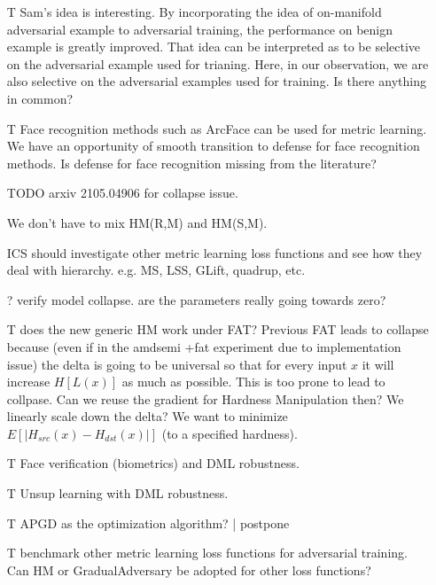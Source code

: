 \begin{itemize}
	
	\item [T] Sam's idea is interesting. By incorporating the idea of
		on-manifold adversarial example to adversarial training, the
		performance on benign example is greatly improved.
		That idea can be interpreted as to be selective on the adversarial
		example used for trianing.
		Here, in our observation, we are also selective on the adversarial
		examples used for training.
		Is there anything in common?

	\item [T] Face recognition methods such as ArcFace can be used for
		metric learning.
		We have an opportunity of smooth transition to defense for face
		recognition methods.
		Is defense for face recognition missing from the literature?

	\item [TODO] arxiv 2105.04906 for collapse issue.

	\item [\cmark] We don't have to mix HM(R,M) and HM(S,M).

	\item [ICS] should investigate other metric learning loss functions and see
		how they deal with hierarchy. e.g. MS, LSS, GLift, quadrup, etc.

	\item [?] verify model collapse. are the parameters really going towards zero?

	\item [T] does the new generic HM work under FAT?
		Previous FAT leads to collapse because (even if in the amdsemi +fat
		experiment due to implementation issue) the delta is going to be universal
		so that for every input $x$ it will increase $H[L(x)]$ as much as possible.
		This is too prone to lead to collpase. Can we reuse the gradient for 
		Hardness Manipulation then? We linearly scale down the delta?
		We want to minimize $E[|H_{src}(x)-H_{dst}(x)|]$ (to a specified hardness).

	\item [T] Face verification (biometrics) and DML robustness.

	\item [T] Unsup learning with DML robustness.

	\item [T] APGD as the optimization algorithm? | postpone

	\item [T] benchmark other metric learning loss functions for adversarial
		training. Can HM or GradualAdversary be adopted for other loss functions?


\end{itemize}
